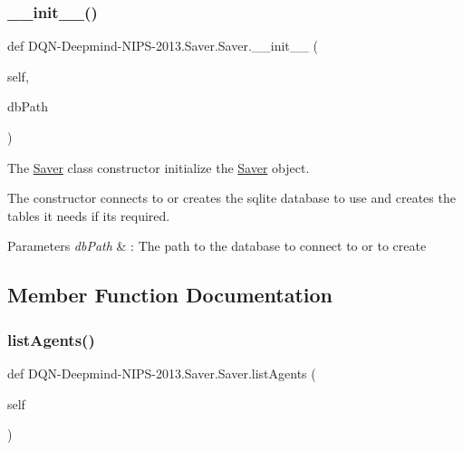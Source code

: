 \subsubsection{\texorpdfstring{\+\_\+\+\_\+init\+\_\+\+\_\+()}{\_\_init\_\_()}}
{\footnotesize\ttfamily def D\+QN-\/Deepmind-\/N\+I\+PS-\/2013.Saver.\+Saver.\+\_\+\+\_\+init\+\_\+\+\_\+ (\begin{DoxyParamCaption}\item[{}]{self,  }\item[{}]{db\+Path }\end{DoxyParamCaption})}



The \hyperlink{classDQN-Deepmind-NIPS-2013_1_1Saver_1_1Saver}{Saver} class constructor initialize the \hyperlink{classDQN-Deepmind-NIPS-2013_1_1Saver_1_1Saver}{Saver} object. 

The constructor connects to or creates the sqlite database to use and creates the tables it needs if its required.


\begin{DoxyParams}{Parameters}
{\em db\+Path} & \+: The path to the database to connect to or to create \\
\hline
\end{DoxyParams}


\subsection{Member Function Documentation}
\hypertarget{classDQN-Deepmind-NIPS-2013_1_1Saver_1_1Saver_a4f61e8fbd52eef88616ef8e9ef0fab2b}{}\label{classDQN-Deepmind-NIPS-2013_1_1Saver_1_1Saver_a4f61e8fbd52eef88616ef8e9ef0fab2b} 
\subsubsection{\texorpdfstring{list\+Agents()}{listAgents()}}
{\footnotesize\ttfamily def D\+QN-\/Deepmind-\/N\+I\+PS-\/2013.Saver.\+Saver.\+list\+Agents (\begin{DoxyParamCaption}\item[{}]{self }\end{DoxyParamCaption})}




